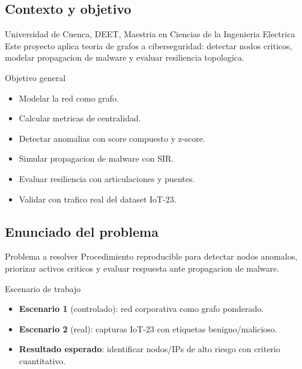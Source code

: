 \subsection{Contexto y objetivo}\label{contexto-y-objetivo}

\begin{frame}{Universidad de Cuenca, DEET, Maestria en Ciencias de la
Ingenieria Electrica}
\protect{}\label{universidad-de-cuenca-deet-maestria-en-ciencias-de-la-ingenieria-electrica}
Este proyecto aplica teoria de grafos a ciberseguridad: detectar nodos
criticos, modelar propagacion de malware y evaluar resiliencia
topologica.
\end{frame}

\begin{frame}{Objetivo general}
\protect{}\label{objetivo-general}
\begin{itemize}
\tightlist
\item
  Modelar la red como grafo.
\item
  Calcular metricas de centralidad.
\item
  Detectar anomalias con score compuesto y z-score.
\item
  Simular propagacion de malware con SIR.
\item
  Evaluar resiliencia con articulaciones y puentes.
\item
  Validar con trafico real del dataset IoT-23.
\end{itemize}
\end{frame}

\subsection{Enunciado del problema}\label{enunciado-del-problema}

\begin{frame}{Problema a resolver}
\protect{}\label{problema-a-resolver}
Procedimiento reproducible para detectar nodos anomalos, priorizar
activos criticos y evaluar respuesta ante propagacion de malware.
\end{frame}

\begin{frame}{Escenario de trabajo}
\protect{}\label{escenario-de-trabajo}
\begin{itemize}
\tightlist
\item
  \textbf{Escenario 1} (controlado): red corporativa como grafo
  ponderado.
\item
  \textbf{Escenario 2} (real): capturas IoT-23 con etiquetas
  benigno/malicioso.
\item
  \textbf{Resultado esperado}: identificar nodos/IPs de alto riesgo con
  criterio cuantitativo.
\end{itemize}
\end{frame}

